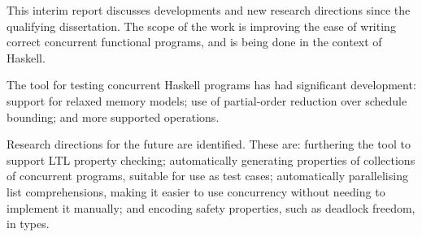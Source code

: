 This interim report discusses developments and new research directions
since the qualifying dissertation. The scope of the work is improving
the ease of writing correct concurrent functional programs, and is
being done in the context of Haskell.

The \dejafu{} tool for testing concurrent Haskell programs has had
significant development: support for relaxed memory models; use of
partial-order reduction over schedule bounding; and more supported
operations.

Research directions for the future are identified. These are:
furthering the \dejafu{} tool to support LTL property checking;
automatically generating properties of collections of concurrent
programs, suitable for use as test cases; automatically parallelising
list comprehensions, making it easier to use concurrency without
needing to implement it manually; and encoding safety properties, such
as deadlock freedom, in types.
